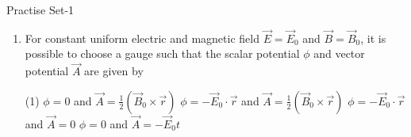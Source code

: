 \newpage
\begin{abox}
	Practise Set-1
\end{abox}
\begin{enumerate}
	\item  For constant uniform electric and magnetic field $\vec{E}=\vec{E}_{0}$ and $\vec{B}=\vec{B}_{0}$, it is possible to choose a gauge such that the scalar potential $\phi$ and vector potential $\vec{A}$ are given by
	{}
	\begin{tasks}(1)
		\task[\textbf{A.}] $\phi=0$ and $\vec{A}=\frac{1}{2}\left(\vec{B}_{0} \times \vec{r}\right)$
		\task[\textbf{B.}] $\phi=-\vec{E}_{0} \cdot \vec{r}$ and $\vec{A}=\frac{1}{2}\left(\vec{B}_{0} \times \vec{r}\right)$
		\task[\textbf{C.}]  $\phi=-\vec{E}_{0} \cdot \vec{r}$ and $\vec{A}=0$
		\task[\textbf{D.}] $\phi=0$ and $\vec{A}=-\vec{E}_{0} t$
	\end{tasks}
	

\end{enumerate}
